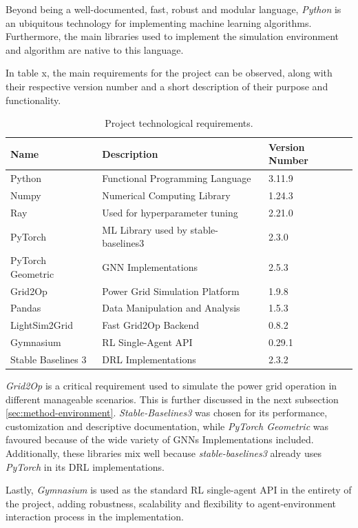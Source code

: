Beyond being a well-documented, fast, robust and modular language, \textit{Python} is an ubiquitous technology for implementing machine learning algorithms. Furthermore, the main libraries used to implement the simulation environment and algorithm are native to this language. \par
In table x, the main requirements for the project can be observed, along with their respective version number and a short description of their purpose and functionality.
\par

\begin{table}[H]
	
	\caption{Project technological requirements.}
	
	\begin{tabular}{lll}
		\toprule
		\textbf{Name} & \textbf{Description} & \textbf{Version Number} \\
		\midrule
		Python & Functional Programming Language & 3.11.9 \\
		Numpy & Numerical Computing Library& 1.24.3 \\
		Ray & Used for hyperparameter tuning & 2.21.0 \\
		PyTorch & \acs{ML} Library used by stable-baselines3 & 2.3.0 \\
		PyTorch Geometric & \ac{GNN} Implementations & 2.5.3 \\
		Grid2Op & Power Grid Simulation Platform & 1.9.8 \\
		Pandas & Data Manipulation and Analysis & 1.5.3 \\
		LightSim2Grid & Fast Grid2Op Backend & 0.8.2 \\
		Gymnasium & \ac{RL} Single-Agent API & 0.29.1 \\
		Stable Baselines 3 & \ac{DRL} Implementations & 2.3.2 \\
		\bottomrule
	\end{tabular}
\end{table}

\textit{Grid2Op} is a critical requirement used to simulate the power grid operation in different manageable scenarios. This is further discussed in the next subsection \ref{sec:method-environment}. \textit{Stable-Baselines3} \cite{raffinStableBaselines3ReliableReinforcement2021} was chosen for its performance, customization and descriptive documentation, while \textit{PyTorch Geometric} was favoured because of the wide variety of \acp{GNN} Implementations included. Additionally, these libraries mix well because \textit{stable-baselines3} already uses \textit{PyTorch} in its \ac{DRL} implementations.
\par
Lastly, \textit{Gymnasium} is used as the standard \ac{RL} single-agent API in the entirety of the project, adding robustness, scalability and flexibility to agent-environment interaction process in the implementation.  \par

